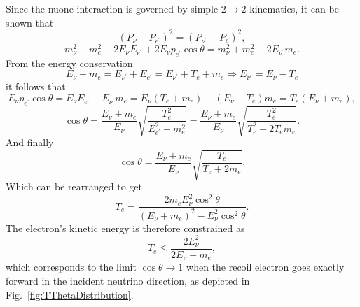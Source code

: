 Since the \gls{nuone} interaction is governed by simple $2\rightarrow 2$ kinematics, it can be shown that
\begin{equation}
\left(P_{\nu}-P_{e^{\prime}}\right)^2=\left(P_{\nu^{\prime}}-P_e\right)^2,
\end{equation}
\begin{equation}
m_{\nu}^2+m_e^2-2E_{\nu}E_{e^{\prime}}+2E_{\nu}p_{e^{\prime}}\cos\theta=m_{\nu}^2+m_e^2-2E_{\nu^{\prime}}m_e.
\end{equation}
From the energy conservation
\begin{equation}
E_{\nu}+m_e=E_{\nu^{\prime}}+E_{e^{\prime}}=E_{\nu^{\prime}}+T_e+m_e\Rightarrow E_{\nu^{\prime}}=E_{\nu}-T_e
\end{equation}
it follows that
\begin{equation}
E_{\nu}p_{e^{\prime}}\cos\theta=E_{\nu}E_{e^{\prime}}-E_{\nu^{\prime}}m_e=E_{\nu}\left(T_e+m_e\right)-\left(E_{\nu}-T_e\right)m_e=T_e\left(E_{\nu}+m_e\right),
\end{equation}
\begin{equation}
\cos\theta=\frac{E_{\nu}+m_e}{E_{\nu}}\sqrt{\frac{T_e^2}{E_{e^{\prime}}^2-m_e^2}}=\frac{E_{\nu}+m_e}{E_{\nu}}\sqrt{\frac{T_e^2}{T_e^2+2T_em_e}}.
\end{equation}
And finally
\begin{equation}\label{eq:ThetaTRelation}
\cos\theta=\frac{E_{\nu}+m_e}{E_{\nu}}\sqrt{\frac{T_e}{T_e+2m_e}}.
\end{equation}
Which can be rearranged to get
\begin{equation}\label{eq:TThetaRelation}
T_e=\frac{2m_eE_\nu^2\cos^2\theta}{\left(E_\nu+m_e\right)^2-E_\nu^2\cos^2\theta}.
\end{equation}
The electron's kinetic energy is therefore constrained as
\begin{equation}
T_e\leq\frac{2E_{\nu}^2}{2E_{\nu}+m_e},
\end{equation}
which corresponds to the limit $\cos\theta\rightarrow 1$ when the recoil electron goes exactly forward in the incident neutrino direction, as depicted in Fig.~\ref{fig:TThetaDistribution}.

